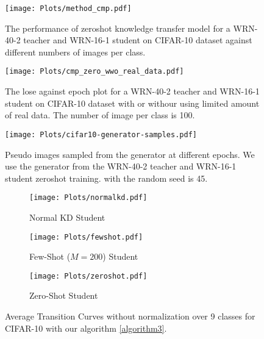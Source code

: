 \documentclass{article}
\begin{document}
\begin{figure}
    \centering
    \begin{minipage}{.48\textwidth}
        \centering
        \texttt{[image: Plots/method\_cmp.pdf]}
        \caption{
            The performance of zeroshot knowledge transfer model for a WRN-40-2 teacher
            and WRN-16-1 student on CIFAR-10 dataset against different numbers of
            images per class.
            }
        \label{fig:KDMethodsPerformance}
    \end{minipage}%
    \hfill
    \begin{minipage}{.48\textwidth}
        \centering
        \texttt{[image: Plots/cmp\_zero\_wwo\_real\_data.pdf]}
        \caption{
            The lose against epoch plot for a WRN-40-2 teacher and WRN-16-1 student
            on CIFAR-10 dataset with or withour using limited amount of real data.
            The number of image per class is 100.
        }
        \label{fig:ZeroshotMethodWWoRealImg}
    \end{minipage}
\end{figure}

\begin{figure}
    \centering
    \texttt{[image: Plots/cifar10-generator-samples.pdf]}
    \caption{
        Pseudo images sampled from the generator at different epochs.
        We use the generator from the WRN-40-2 teacher and WRN-16-1 student zeroshot training.
        with the random seed is 45.}
    \label{fig:GenerativeModelsSamples}
\end{figure}

\begin{figure}[h!]
  \centering
  \begin{subfigure}[b]{0.32\linewidth}
    \texttt{[image: Plots/normalkd.pdf]}
     \caption{Normal KD Student}
  \end{subfigure}
  \begin{subfigure}[b]{0.32\linewidth}
    \texttt{[image: Plots/fewshot.pdf]}
    \caption{Few-Shot ($M=200$) Student}
  \end{subfigure}
  \begin{subfigure}[b]{0.32\linewidth}
    \texttt{[image: Plots/zeroshot.pdf]}
    \caption{Zero-Shot Student}
  \end{subfigure}
  \caption{Average Transition Curves without normalization over 9 classes for CIFAR-10 with our algorithm \ref{algorithm3}.}
  \label{fig:TCurvesWONormalize}
\end{figure}
\end{document}
